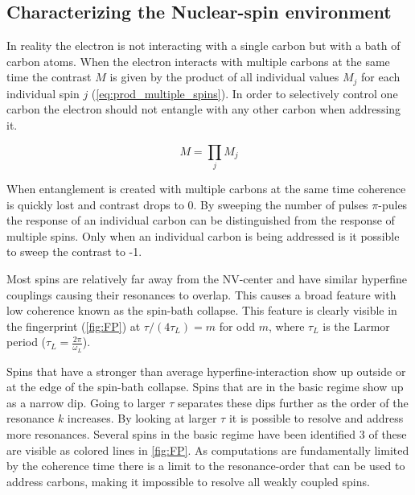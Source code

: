 \subsection{Characterizing the Nuclear-spin environment}

In reality the electron is not interacting with a single carbon but with a bath of carbon atoms. When the electron interacts with multiple carbons at the same time the contrast $M$ is given by the product of all individual values $M_j$ for each individual spin $j$ (\cref{eq:prod_multiple_spins}). In order to selectively control one carbon the electron should not entangle with any other carbon when addressing it.

\begin{equation}
\label{eq:prod_multiple_spins}
    M = \prod_{j}{M_j}
\end{equation}

When entanglement is created with multiple carbons at the same time coherence is quickly lost and contrast drops to 0.
By sweeping the number of pulses $\pi$-pules the response of an individual carbon can be distinguished from the response of multiple spins.
Only when an individual carbon is being addressed is it possible to sweep the contrast to -1.


Most spins are relatively far away from the NV-center and have similar hyperfine couplings causing their resonances to overlap. This causes a broad feature with low coherence known as the spin-bath collapse. This feature is clearly visible in the fingerprint (\cref{fig:FP}) at $\tau/(4\tau_L) = m$ for odd $m$, where $\tau_L$ is the Larmor period ($\tau_L = \frac{2\pi}{\omega_L} $).

Spins that have a stronger than average hyperfine-interaction show up outside or at the edge of the spin-bath collapse.
Spins that are in the basic regime show up as a narrow dip.
Going to larger $\tau$ separates these dips further as the order of the resonance $k$ increases.
By looking at larger $\tau$ it is possible to resolve and address more resonances.
Several spins in the basic regime have been identified 3 of these are visible as colored lines in \cref{fig:FP}.
As computations are fundamentally limited by the coherence time there is a limit to the resonance-order that can be used to address carbons, making it impossible to resolve all weakly coupled spins.

